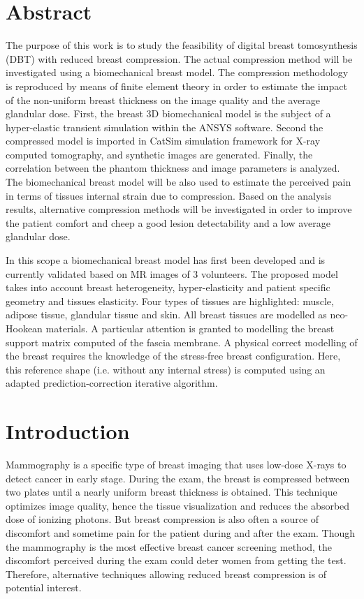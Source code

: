 
\section{Abstract}
The purpose of this work is to study the feasibility of digital breast tomosynthesis (DBT) with reduced breast compression. The actual compression method will be investigated using a biomechanical breast model. The compression methodology is reproduced by means of finite element theory in order to estimate the impact of the non-uniform breast thickness on the image quality and the average glandular dose. First, the breast 3D biomechanical model is the subject of a hyper-elastic transient simulation within the ANSYS software. Second the compressed model is imported in CatSim simulation framework for X-ray computed tomography, and synthetic images are generated. Finally, the correlation between the phantom thickness and image parameters is analyzed. The biomechanical breast model will be also used to estimate the perceived pain in terms of tissues internal strain due to compression.
 Based on the analysis results, alternative compression methods will be investigated in order to improve the patient comfort and cheep a good lesion detectability and a low average glandular dose.

In this scope a biomechanical breast model has first been developed and is currently validated based on MR images of 3 volunteers. The proposed model takes into account breast heterogeneity, hyper-elasticity and patient specific geometry and tissues elasticity. Four types of tissues are highlighted: muscle, adipose tissue, glandular tissue and skin. All breast tissues are modelled as neo-Hookean materials. A particular attention is granted to modelling the breast support matrix computed of the fascia membrane. A physical correct modelling of the breast requires the knowledge of the stress-free breast configuration. Here, this reference shape (i.e. without any internal stress) is computed using an adapted prediction-correction iterative algorithm. 


\section{Introduction}
Mammography is a specific type of breast imaging that uses low-dose X-rays to detect cancer in early stage. During the exam, the breast is compressed between two plates until a nearly uniform breast thickness is obtained. This technique optimizes image quality, hence the tissue visualization and reduces the absorbed dose of ionizing photons.  But breast compression is also often a source of discomfort and sometime pain for the patient during and after the exam. Though the mammography is the most effective breast cancer screening method, the discomfort perceived during the exam could deter women from getting the test. Therefore, alternative techniques allowing reduced breast compression is of potential interest.

